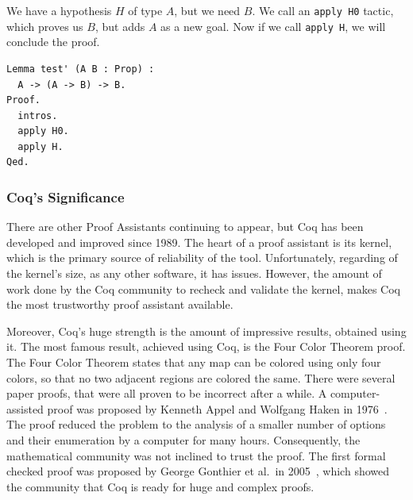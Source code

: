 We have a hypothesis $H$ of type $A$, but we need $B$. We call an \texttt{apply H0} tactic, which proves us $B$, but adds $A$ as a new goal. Now if we call \texttt{apply H}, we will conclude the proof. 

\vspace{0.5cm}
\begin{lstlisting}[language=coq]
Lemma test' (A B : Prop) :
  A -> (A -> B) -> B.
Proof.
  intros.
  apply H0.
  apply H.
Qed.
\end{lstlisting}

\subsubsection{Coq's Significance}
There are other Proof Assistants continuing to appear, but Coq has been developed and improved since 1989. The heart of a proof assistant is its kernel, which is the primary source of reliability of the tool. Unfortunately, regarding of the kernel's size, as any other software, it has issues. However, the amount of work done by the Coq community to recheck and validate the kernel, makes Coq the most trustworthy proof assistant available.

Moreover, Coq's huge strength is the amount of impressive results, obtained using it. The most famous result, achieved using Coq, is the Four Color Theorem proof. The Four Color Theorem states that any map can be colored using only four colors, so that no two adjacent regions are colored the same. There were several paper proofs, that were all proven to be incorrect after a while. A computer-assisted proof was proposed by Kenneth Appel and Wolfgang Haken in 1976~\cite{appel_4color1976}. The proof reduced the problem to the analysis of a smaller number of options and their enumeration by a computer for many hours. Consequently, the mathematical community was not inclined to trust the proof. The first formal checked proof was proposed by George Gonthier et al.\ in 2005~\cite{Gonthier2008FormalPF}, which showed the community that Coq is ready for huge and complex proofs. 

